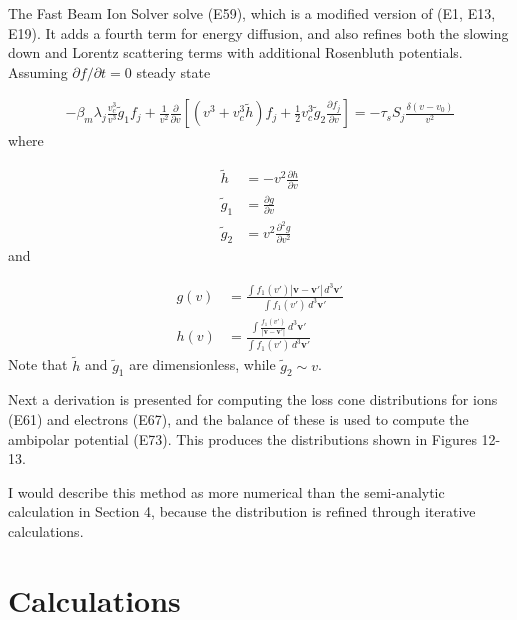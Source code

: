 \documentclass{article}
\numberwithin{equation}{section}
\newcommand\pd[2]{ \frac{\partial #1}{\partial #2} }
\newcommand\bm[1]{ \mathbf{#1} }
\newcommand\setp[1]{\left( #1 \right) }
\newcommand\setb[1]{\left[ #1 \right] }
\newcommand\eq[1]{
    \begin{equation}
        \begin{split} #1 \end{split}
    \end{equation} }
\begin{document}
\begin{itemize}
	The Fast Beam Ion Solver solve (E59), which is a modified version of (E1, E13, E19). It adds a fourth term for energy diffusion, and also refines both the slowing down and Lorentz scattering terms with additional Rosenbluth potentials. Assuming $\partial f/\partial t = 0$ steady state
	\eq{
		-\beta_m \lambda_j \frac{v_c^3}{v^3} \tilde g_1 f_j
		+ \frac{1}{v^2} \pd{}{v} \setb{
			\setp{v^3 + v_c^3 \tilde h} f_j
			+ \frac{1}{2} v_c^3 \tilde g_2 \pd{f_j}{v}
		}
		= - \tau_s S_j \frac{\delta(v - v_0)}{v^2}
	} 
	where
	\eq{
		\tilde h &= - v^2 \pd{h}{v} \\
		\tilde g_1 &= \pd{g}{v} \\
		\tilde g_2 &= v^2 \pd{^2g}{v^2}
	}
	and
	\eq{
		g(v) &= \frac{ \int f_1(v') |\bm{v} - \bm{v'}|\, d^3 \bm{v'}}
		{\int f_1(v') \, d^3 \bm{v'}} \\
		h(v) &= \frac{ \int \frac{f_1(v')} {|\bm{v} - \bm{v'}| } \, d^3 \bm{v'}}
		{\int f_1(v') \, d^3 \bm{v'}}
	}
	Note that $\tilde h$ and $\tilde g_1$ are dimensionless, while $\tilde g_2 \sim v$. 

	Next a derivation is presented for computing the loss cone distributions for ions (E61) and electrons (E67), and the balance of these is used to compute the ambipolar potential (E73). This produces the distributions shown in Figures 12-13.

	I would describe this method as more numerical than the semi-analytic calculation in Section 4, because the distribution is refined through iterative calculations.
\end{itemize}

\section{Calculations}
\end{document}
